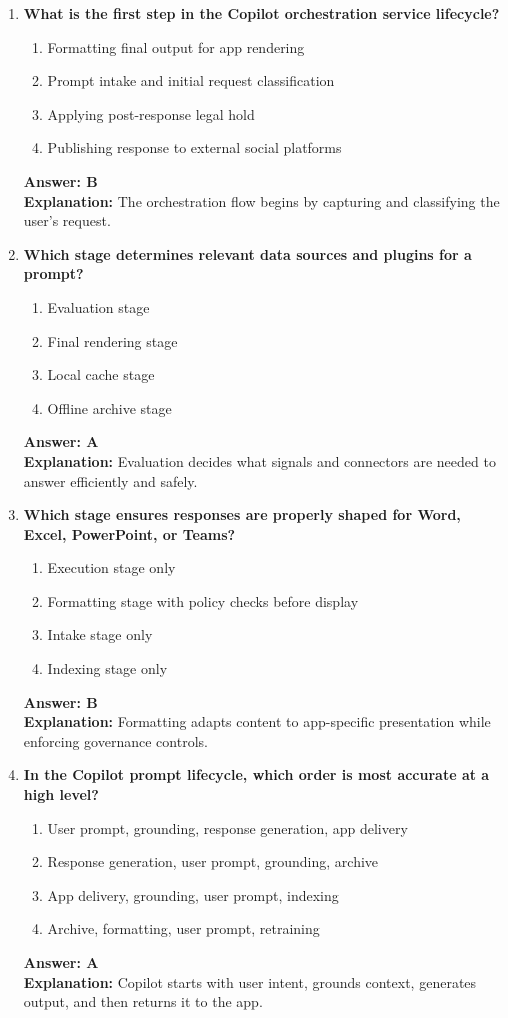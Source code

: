 \documentclass[10pt]{article}
\begin{document}
\begin{enumerate}[leftmargin=*]
\item \textbf{What is the first step in the Copilot orchestration service lifecycle?}
\begin{enumerate}[label=\Alph*.]
  \item Formatting final output for app rendering
  \item Prompt intake and initial request classification
  \item Applying post-response legal hold
  \item Publishing response to external social platforms
\end{enumerate}
\textbf{Answer: B}\\
\textbf{Explanation:} The orchestration flow begins by capturing and classifying the user’s request.

\item \textbf{Which stage determines relevant data sources and plugins for a prompt?}
\begin{enumerate}[label=\Alph*.]
  \item Evaluation stage
  \item Final rendering stage
  \item Local cache stage
  \item Offline archive stage
\end{enumerate}
\textbf{Answer: A}\\
\textbf{Explanation:} Evaluation decides what signals and connectors are needed to answer efficiently and safely.


\item \textbf{Which stage ensures responses are properly shaped for Word, Excel, PowerPoint, or Teams?}
\begin{enumerate}[label=\Alph*.]
  \item Execution stage only
  \item Formatting stage with policy checks before display
  \item Intake stage only
  \item Indexing stage only
\end{enumerate}
\textbf{Answer: B}\\
\textbf{Explanation:} Formatting adapts content to app-specific presentation while enforcing governance controls.

\item \textbf{In the Copilot prompt lifecycle, which order is most accurate at a high level?}
\begin{enumerate}[label=\Alph*.]
  \item User prompt, grounding, response generation, app delivery
  \item Response generation, user prompt, grounding, archive
  \item App delivery, grounding, user prompt, indexing
  \item Archive, formatting, user prompt, retraining
\end{enumerate}
\textbf{Answer: A}\\
\textbf{Explanation:} Copilot starts with user intent, grounds context, generates output, and then returns it to the app.


\end{enumerate}
\end{document}
